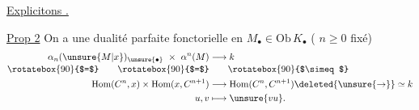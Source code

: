 
\uline{Explicitons .}

\uline{Prop 2} On a une dualité parfaite fonctorielle en $M_\bullet\in\mathrm{Ob}\,K_\bullet$
( $n\geq0$ fixé)
\[
\begin{aligned}
 \alpha_n(\unsure{M|x})_{\unsure{\bullet}}\ \times\ 
 \alpha^n(M)&\longrightarrow k\\[-2pt]
 \rotatebox{90}{$=$}\qquad \rotatebox{90}{$=$} &\qquad \rotatebox{90}{$\simeq$}\\
 \mathrm{Hom}(C^n,x)\times\mathrm{Hom}(x,C^{n+1})&\longrightarrow
 \mathrm{Hom}(C^n,C^{n+1})\deleted{\unsure{\to}}\simeq k\\
 u,v&\longmapsto\unsure{vu}.
\end{aligned}
\]
